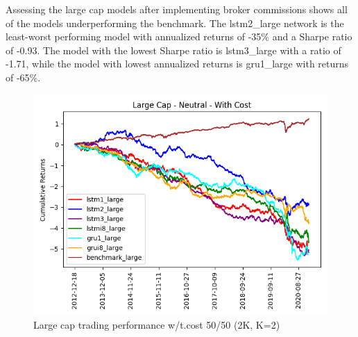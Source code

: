\indent\newline 
\begin{table}[ht]
\centering
{}
\caption{50/50 long-short large cap w/t.cost (2K, K=2)}
\end{table}
\indent\newline 
Assessing the large cap models after implementing broker commissions shows all of the models underperforming the benchmark. The lstm2\_large network is the least-worst performing model with annualized returns of -35\% and a Sharpe ratio of -0.93. The model with the lowest Sharpe ratio is lstm3\_large with a ratio of -1.71, while the model with lowest annualized returns is gru1\_large with returns of -65\%.  
\indent\newline 
\begin{figure}[H]
\centering
\includegraphics [scale=0.60,angle=360]{figures/cumulative_large_cap_return_with_cost_n.png}
\caption{Large cap trading performance w/t.cost 50/50 (2K, K=2)}
\label{fig:5050largec}
\end{figure} 
